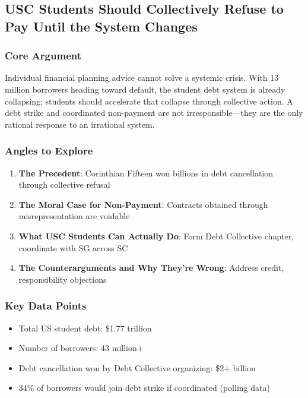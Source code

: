 \documentclass[11pt,letterpaper]{article}
\begin{document}
\newpage
\subsection{USC Students Should Collectively Refuse to Pay Until the System Changes}

\subsubsection*{Core Argument}
Individual financial planning advice cannot solve a systemic crisis. With 13 million borrowers heading toward default, the student debt system is already collapsing; students should accelerate that collapse through collective action. A debt strike and coordinated non-payment are not irresponsible---they are the only rational response to an irrational system.

\subsubsection*{Angles to Explore}
\begin{enumerate}[noitemsep]
    \item \textbf{The Precedent}: Corinthian Fifteen won billions in debt cancellation through collective refusal
    \item \textbf{The Moral Case for Non-Payment}: Contracts obtained through misrepresentation are voidable
    \item \textbf{What USC Students Can Actually Do}: Form Debt Collective chapter, coordinate with SG across SC
    \item \textbf{The Counterarguments and Why They're Wrong}: Address credit, responsibility objections
\end{enumerate}

\subsubsection*{Key Data Points}
\begin{itemize}[noitemsep]
    \item Total US student debt: \$1.77 trillion
    \item Number of borrowers: 43 million+
    \item Debt cancellation won by Debt Collective organizing: \$2+ billion
    \item 34\% of borrowers would join debt strike if coordinated (polling data)
\end{itemize}
\end{document}
